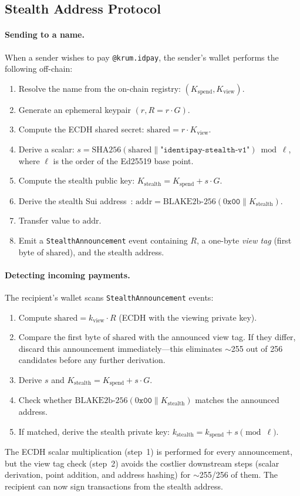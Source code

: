\documentclass[11pt]{article}
\begin{document}
\subsection{Stealth Address Protocol}
\paragraph{Sending to a name.}
When a sender wishes to pay \texttt{@krum.idpay}, the sender's wallet performs the following off-chain:
\begin{enumerate}
  \item Resolve the name from the on-chain registry: $(K_{\mathrm{spend}}, K_{\mathrm{view}})$.
  \item Generate an ephemeral keypair $(r, R = r \cdot G)$.
  \item Compute the ECDH shared secret: $\mathrm{shared} = r \cdot K_{\mathrm{view}}$.
  \item Derive a scalar: $s = \mathrm{SHA256}(\mathrm{shared} \parallel \texttt{"identipay-stealth-v1"}) \bmod \ell$, where $\ell$ is the order of the Ed25519 base point.
  \item Compute the stealth public key: $K_{\mathrm{stealth}} = K_{\mathrm{spend}} + s \cdot G$.
  \item Derive the stealth Sui address~\cite{blake2}: $\mathrm{addr} = \mathrm{BLAKE2b\text{-}256}(0\texttt{x00} \parallel K_{\mathrm{stealth}})$.
  \item Transfer value to $\mathrm{addr}$.
  \item Emit a \texttt{StealthAnnouncement} event containing $R$, a one-byte \emph{view tag} (first byte of $\mathrm{shared}$), and the stealth address.
\end{enumerate}

\paragraph{Detecting incoming payments.}
The recipient's wallet scans \texttt{StealthAnnouncement} events:
\begin{enumerate}
  \item Compute $\mathrm{shared} = k_{\mathrm{view}} \cdot R$ (ECDH with the viewing private key).
  \item Compare the first byte of $\mathrm{shared}$ with the announced view tag. If they differ, discard this announcement immediately---this eliminates $\sim$255 out of 256 candidates before any further derivation.
  \item Derive $s$ and $K_{\mathrm{stealth}} = K_{\mathrm{spend}} + s \cdot G$.
  \item Check whether $\mathrm{BLAKE2b\text{-}256}(0\texttt{x00} \parallel K_{\mathrm{stealth}})$ matches the announced address.
  \item If matched, derive the stealth private key: $k_{\mathrm{stealth}} = k_{\mathrm{spend}} + s \pmod{\ell}$.
\end{enumerate}
The ECDH scalar multiplication (step~1) is performed for every announcement, but the view tag check (step~2) avoids the costlier downstream steps (scalar derivation, point addition, and address hashing) for $\sim$255/256 of them.
The recipient can now sign transactions from the stealth address.
\end{document}
